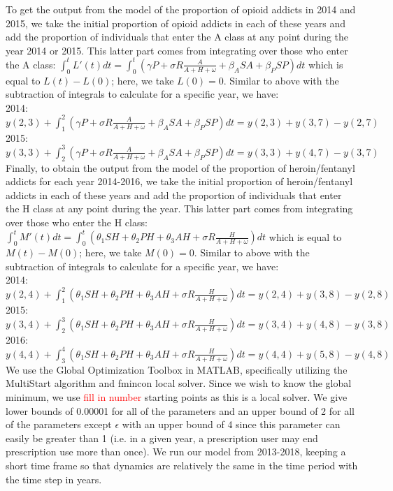 \documentclass[12pt]{article}
\begin{document}
 To get the output from the model of the proportion of opioid addicts in 2014 and 2015, we take the initial proportion of opioid addicts in each of these years and add the proportion of individuals that enter the A class at any point during the year 2014 or 2015. This latter part comes from integrating over those who enter the A class: $\int_0^t L'(t)dt=\int_0^t (\gamma P + \sigma R\frac{A}{A+H+\omega}+\beta_A SA+\beta_P SP) dt$ which is equal to $L(t)-L(0)$; here, we take $L(0)=0.$ Similar to above with the subtraction of integrals to calculate for a specific year, we have: \\
 2014: $y(2,3)+\int_1^2 (\gamma P + \sigma R\frac{A}{A+H+\omega}+\beta_A SA+\beta_P SP) dt= y(2,3)+y(3,7)-y(2,7)$ \\
 2015: $y(3,3)+\int_2^3 (\gamma P + \sigma R\frac{A}{A+H+\omega}+\beta_A SA+\beta_P SP) dt= y(3,3)+y(4,7)-y(3,7)$ \\


Finally, to obtain the output from the model of the proportion of heroin/fentanyl addicts for each year 2014-2016, we take the initial proportion of heroin/fentanyl addicts in each of these years and add the proportion of individuals that enter the H class at any point during the year. This latter part comes from integrating over those who enter the H class: $\int_0^t M'(t)dt=\int_0^t (\theta_1 SH+\theta_2 PH+\theta_3 AH +\sigma R \frac{H}{A+H+\omega})dt$ which is equal to $M(t)-M(0)$; here, we take $M(0)=0.$ Similar to above with the subtraction of integrals to calculate for a specific year, we have: \\
 2014: $y(2,4)+\int_1^2  (\theta_1 SH+\theta_2 PH+\theta_3 AH +\sigma R \frac{H}{A+H+\omega}) dt= y(2,4)+y(3,8)-y(2,8)$ \\
 2015: $y(3,4)+\int_2^3  (\theta_1 SH+\theta_2 PH+\theta_3 AH +\sigma R \frac{H}{A+H+\omega}) dt= y(3,4)+y(4,8)-y(3,8)$ \\
 2016: $y(4,4)+\int_3^4  (\theta_1 SH+\theta_2 PH+\theta_3 AH +\sigma R \frac{H}{A+H+\omega}) dt= y(4,4)+y(5,8)-y(4,8)$ \\


We use the Global Optimization Toolbox in MATLAB, specifically utilizing the MultiStart algorithm and fmincon local solver. Since we wish to know the global minimum, we use \textcolor{red}{fill in number} starting points as this is a local solver. We give lower bounds of 0.00001 for all of the parameters and an upper bound of 2 for all of the parameters except $\epsilon$ with an upper bound of 4 since this parameter can easily be greater than 1 (i.e. in a given year, a prescription user may end prescription use more than once). We run our model from 2013-2018, keeping a short time frame so that dynamics are relatively the same in the time period with the time step in years. 
\end{document}
